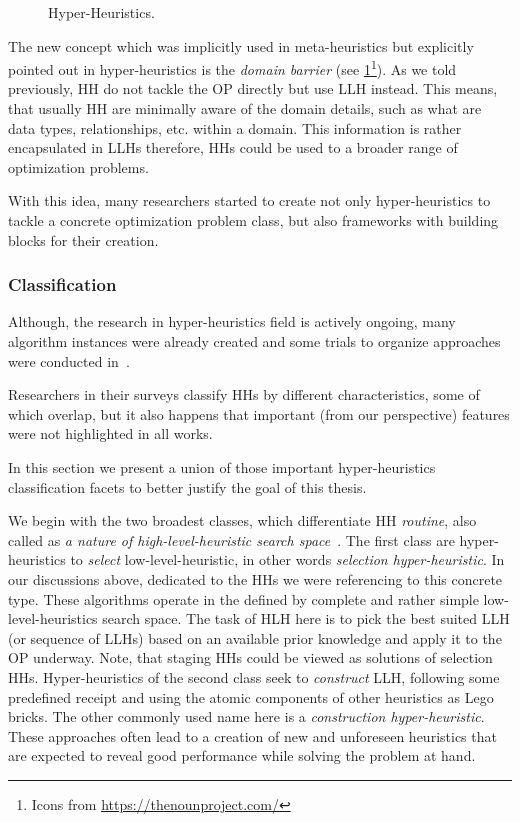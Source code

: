 \begin{figure}
	\raggedleft
	
	\caption[Hyper-Heuristics]{Hyper-Heuristics.}
	\label{bg:pic:HH}
\end{figure}

The new concept which was implicitly used in meta-heuristics but explicitly pointed out in hyper-heuristics is the \emph{domain barrier} (see \cref{bg:pic:HH}\footnote{Icons from \url{https://thenounproject.com/}}).
As we told previously, HH do not tackle the OP directly but use LLH instead. This means, that usually HH are minimally aware of the domain details, such as what are data types, relationships, etc. within a domain. This information is rather encapsulated in LLHs therefore, HHs could be used to a broader range of optimization problems.

With this idea, many researchers started to create not only hyper-heuristics to tackle a concrete optimization problem class, but also frameworks with building blocks for their creation.


\subsubsection{Classification}
Although, the research in hyper-heuristics field is actively ongoing, many algorithm instances were already created and some trials to organize approaches were conducted in~\cite{ryser2014review,drake2019recent,burke2019classification,kerschke2019automated}.

Researchers in their surveys classify HHs by different characteristics, some of which overlap, but it also happens that important (from our perspective) features were not highlighted in all works. 

In this section we present a union of those important hyper-heuristics classification facets to better justify the goal of this thesis.

We begin with the two broadest classes, which differentiate HH \emph{routine}, also called as \emph{a nature of high-level-heuristic search space}~\cite{burke2013hyper,burke2019classification,drake2019recent}.
The first class are hyper-heuristics to \emph{select} low-level-heuristic, in other words \emph{selection hyper-heuristic}. In our discussions above, dedicated to the HHs we were referencing to this concrete type. These algorithms operate in the defined by complete and rather simple low-level-heuristics search space. The task of HLH here is to pick the best suited LLH (or sequence of LLHs) based on an available prior knowledge and apply it to the OP underway. Note, that staging HHs could be viewed as solutions of selection HHs.
Hyper-heuristics of the second class seek to \emph{construct} LLH, following some predefined receipt and using the atomic components of other heuristics as Lego bricks. The other commonly used name here is a \emph{construction hyper-heuristic}. These approaches often lead to a creation of new and unforeseen heuristics that are expected to reveal good performance while solving the problem at hand.

